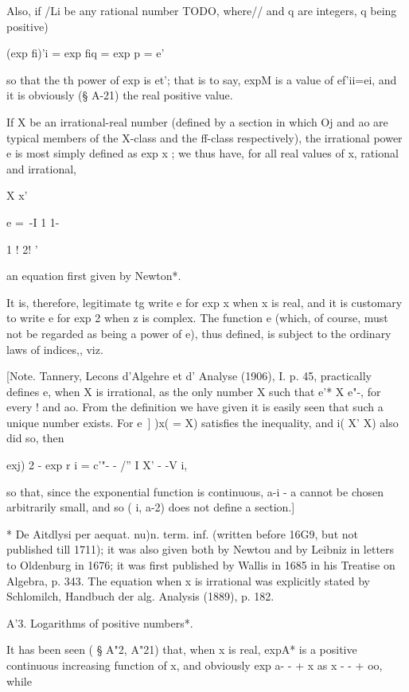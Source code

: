 Also, if /Li be any rational number TODO, where// and q are integers,
q being positive)

(exp fi)'i = exp fiq = exp p = e'\

so that the th power of exp is et'; that is to say, expM is a value
of ef'ii=ei, and it is obviously (§ A-21) the real positive value.

If X be an irrational-real number (defined by a section in which Oj
and ao are typical members of the X-class and the ff-class
respectively), the irrational power e is most simply defined as exp x
; we thus have, for all real values of x, rational and irrational,

X x'

e =\ -I 1 1-

1 ! 2! '

an equation first given by Newton*.

It is, therefore, legitimate tg write e for exp x when x is real, and
it is customary to write e for exp 2 when z is complex. The function e
(which, of course, must not be regarded as being a power of e), thus
defined, is subject to the ordinary laws of indices,, viz.

[Note. Tannery, Lecons d'Algehre et d' Analyse (1906), I. p. 45,
practically defines e, when X is irrational, as the only number X
such that e'* X e"-, for every ! and ao. From the definition we have
given it is easily seen that such a unique number exists. For e\ ] )x(
= X) satisfies the inequality, and i( X' X) also did so, then

exj) 2 - exp r i = c'"- - /'' I X' - -V i,

so that, since the exponential function is continuous, a-i - a cannot
be chosen arbitrarily small, and so ( i, a-2) does not define a
section.]

* De Aitdlysi per aequat. nu)n. term. inf. (written before 16G9, but
not published till 1711); it was also given both by Newtou and by
Leibniz in letters to Oldenburg in 1676; it was first published by
Wallis in 1685 in his Treatise on Algebra, p. 343. The equation when x
is irrational was explicitly stated by Schlomilch, Handbuch der alg.
Analysis (1889), p. 182.

%
%

A'3. Logarithms of positive numbers*.

It has been seen ( § A"2, A"21) that, when x is real, expA* is a
positive continuous increasing function of x, and obviously exp a- - +
x as x - - + oo, while

